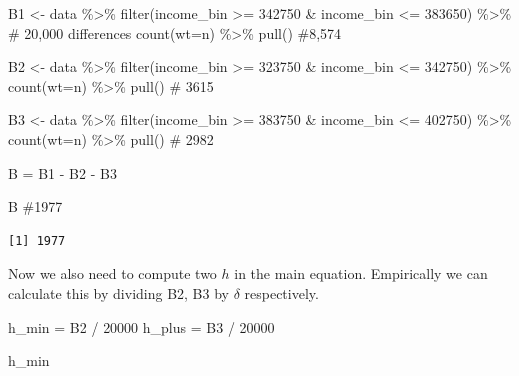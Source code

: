\documentclass[
  letterpaper,
  DIV=11,
  numbers=noendperiod]{scrartcl}
\newenvironment{Shaded}{\begin{snugshade}}{\end{snugshade}}
\newcommand{\AttributeTok}[1]{\textcolor[rgb]{0.40,0.45,0.13}{#1}}
\newcommand{\CommentTok}[1]{\textcolor[rgb]{0.37,0.37,0.37}{#1}}
\newcommand{\DecValTok}[1]{\textcolor[rgb]{0.68,0.00,0.00}{#1}}
\newcommand{\FunctionTok}[1]{\textcolor[rgb]{0.28,0.35,0.67}{#1}}
\newcommand{\NormalTok}[1]{\textcolor[rgb]{0.00,0.23,0.31}{#1}}
\newcommand{\OtherTok}[1]{\textcolor[rgb]{0.00,0.23,0.31}{#1}}
\newcommand{\SpecialCharTok}[1]{\textcolor[rgb]{0.37,0.37,0.37}{#1}}
\begin{document}
\begin{Shaded}
\begin{Highlighting}[]
\NormalTok{B1  }\OtherTok{\textless{}{-}}\NormalTok{ data }\SpecialCharTok{\%\textgreater{}\%} 
  \FunctionTok{filter}\NormalTok{(income\_bin }\SpecialCharTok{\textgreater{}=} \DecValTok{342750} \SpecialCharTok{\&}\NormalTok{ income\_bin }\SpecialCharTok{\textless{}=} \DecValTok{383650}\NormalTok{) }\SpecialCharTok{\%\textgreater{}\%}  \CommentTok{\# 20,000 differences}
  \FunctionTok{count}\NormalTok{(}\AttributeTok{wt=}\NormalTok{n) }\SpecialCharTok{\%\textgreater{}\%} 
  \FunctionTok{pull}\NormalTok{() }\CommentTok{\#8,574}

\NormalTok{B2 }\OtherTok{\textless{}{-}}\NormalTok{ data }\SpecialCharTok{\%\textgreater{}\%} 
  \FunctionTok{filter}\NormalTok{(income\_bin }\SpecialCharTok{\textgreater{}=} \DecValTok{323750} \SpecialCharTok{\&}\NormalTok{ income\_bin }\SpecialCharTok{\textless{}=} \DecValTok{342750}\NormalTok{) }\SpecialCharTok{\%\textgreater{}\%} 
  \FunctionTok{count}\NormalTok{(}\AttributeTok{wt=}\NormalTok{n) }\SpecialCharTok{\%\textgreater{}\%} 
  \FunctionTok{pull}\NormalTok{() }\CommentTok{\# 3615}

\NormalTok{B3 }\OtherTok{\textless{}{-}}\NormalTok{ data }\SpecialCharTok{\%\textgreater{}\%} 
  \FunctionTok{filter}\NormalTok{(income\_bin }\SpecialCharTok{\textgreater{}=} \DecValTok{383750} \SpecialCharTok{\&}\NormalTok{ income\_bin }\SpecialCharTok{\textless{}=} \DecValTok{402750}\NormalTok{) }\SpecialCharTok{\%\textgreater{}\%} 
  \FunctionTok{count}\NormalTok{(}\AttributeTok{wt=}\NormalTok{n) }\SpecialCharTok{\%\textgreater{}\%} 
  \FunctionTok{pull}\NormalTok{() }\CommentTok{\# 2982}

\NormalTok{B }\OtherTok{=}\NormalTok{ B1 }\SpecialCharTok{{-}}\NormalTok{ B2 }\SpecialCharTok{{-}}\NormalTok{ B3}

\NormalTok{B }\CommentTok{\#1977}
\end{Highlighting}
\end{Shaded}

\begin{verbatim}
[1] 1977
\end{verbatim}

Now we also need to compute two \(h\) in the main equation. Empirically
we can calculate this by dividing B2, B3 by \(\delta\) respectively.

\begin{Shaded}
\begin{Highlighting}[]
\NormalTok{h\_min }\OtherTok{=}\NormalTok{ B2 }\SpecialCharTok{/} \DecValTok{20000}
\NormalTok{h\_plus }\OtherTok{=}\NormalTok{ B3 }\SpecialCharTok{/} \DecValTok{20000}

\NormalTok{h\_min}
\end{Highlighting}
\end{Shaded}
\end{document}
